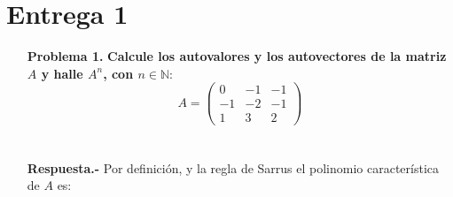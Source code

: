 \section*{\center Entrega 1}
\vspace*{1cm}

\begin{enumerate}

    \item[\bfseries Problema 1.] \textbf{\boldmath Calcule los autovalores y los autovectores de la matriz $A$ y halle $A^n$, con $n\in \mathbb{N}:$}\\

    $$A=\begin{pmatrix}
	0 & -1 & -1 \\
	-1 & -2 & -1 \\
	1 & 3 & 2 
    \end{pmatrix}$$\\\\

    \textbf{Respuesta.-}\;  Por definición, y la regla de Sarrus el polinomio característica de $A$ es:
    

\end{enumerate}

